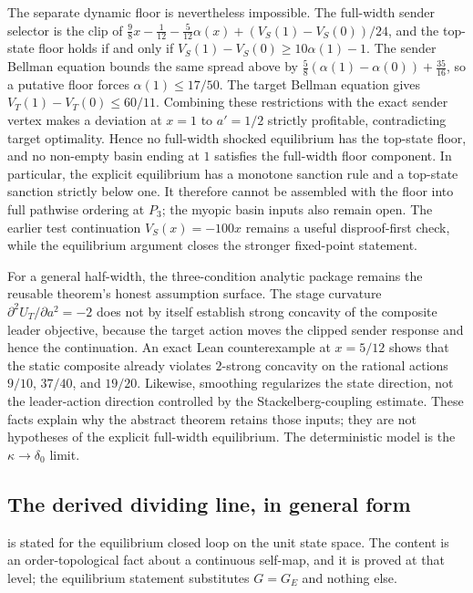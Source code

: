The separate dynamic floor is nevertheless impossible. The full-width sender
selector is the clip of
$\tfrac98x-\tfrac1{12}-\tfrac5{12}\alpha(x)
 +(V_S(1)-V_S(0))/24$, and the top-state floor holds if and only if
$V_S(1)-V_S(0)\ge10\alpha(1)-1$. The sender Bellman equation bounds the same
spread above by
$\tfrac58(\alpha(1)-\alpha(0))+\tfrac{35}{16}$, so a putative floor forces
$\alpha(1)\le17/50$. The target Bellman equation gives
$V_T(1)-V_T(0)\le60/11$. Combining these restrictions with the exact sender
vertex makes a deviation at $x=1$ to $a'=1/2$ strictly profitable, contradicting
target optimality. Hence no full-width shocked equilibrium has the top-state
floor, and no non-empty basin ending at $1$ satisfies the full-width floor
component. In particular, the explicit equilibrium has a monotone sanction
rule and a top-state sanction strictly below one. It therefore cannot be
assembled with the floor into full pathwise ordering at $P_3$; the myopic
basin inputs also remain open. The earlier test continuation $V_S(x)=-100x$
remains a useful disproof-first check, while the equilibrium argument closes the
stronger fixed-point statement.

For a general half-width, the three-condition analytic package remains the
reusable theorem's honest assumption surface. The stage curvature
$\partial^2U_T/\partial a^2=-2$ does not by itself establish strong concavity
of the composite leader objective, because the target action moves the clipped
sender response and hence the continuation. An exact Lean counterexample at
$x=5/12$ shows that the static composite already violates $2$-strong concavity
on the rational actions $9/10$, $37/40$, and $19/20$. Likewise, smoothing
regularizes the state direction, not the leader-action direction controlled by
the Stackelberg-coupling estimate. These facts explain why the abstract theorem
retains those inputs; they are not hypotheses of the explicit full-width
equilibrium. The deterministic model is the $\kappa\to\delta_0$ limit.

\subsection{The derived dividing line, in general form}
\label{app:derived-dividing-line}

 is stated for the equilibrium closed loop on
the unit state space. The content is an order-topological fact about a
continuous self-map, and it is proved at that level; the equilibrium statement
substitutes $G=G_E$ and nothing else.

